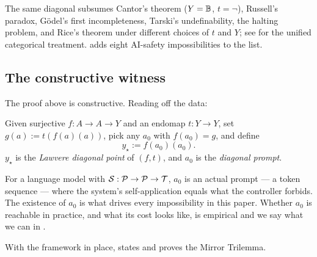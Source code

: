 \begin{remark}
\label{rem:scope}
The same diagonal subsumes Cantor's theorem ($Y = \mathbb{B}$, $t = \neg$), Russell's paradox, G\"odel's first incompleteness, Tarski's undefinability, the halting problem, and Rice's theorem under different choices of $t$ and $Y$; see \citet{yanofsky2003} for the unified categorical treatment.  adds eight AI-safety impossibilities to the list.
\end{remark}

\subsection{The constructive witness}
\label{subsec:diagonal-point}

The proof above is constructive. Reading off the data:

\begin{definition}
\label{def:diagonal-point}
Given surjective $f : A \to A \to Y$ and an endomap $t : Y \to Y$, set $g(a) := t(f(a)(a))$, pick any $a_0$ with $f(a_0) = g$, and define
\begin{equation}
y_\star := f(a_0)(a_0).
\end{equation}
$y_\star$ is the \emph{Lawvere diagonal point} of $(f, t)$, and $a_0$ is the \emph{diagonal prompt}.
\end{definition}

For a language model with $\mathcal{S} : \mathcal{P} \to \mathcal{P} \to \mathcal{T}$, $a_0$ is an actual prompt --- a token sequence --- where the system's self-application equals what the controller forbids. The existence of $a_0$ is what drives every impossibility in this paper. Whether $a_0$ is reachable in practice, and what its cost looks like, is empirical and we say what we can in .

\medskip
With the framework in place,  states and proves the Mirror Trilemma.
